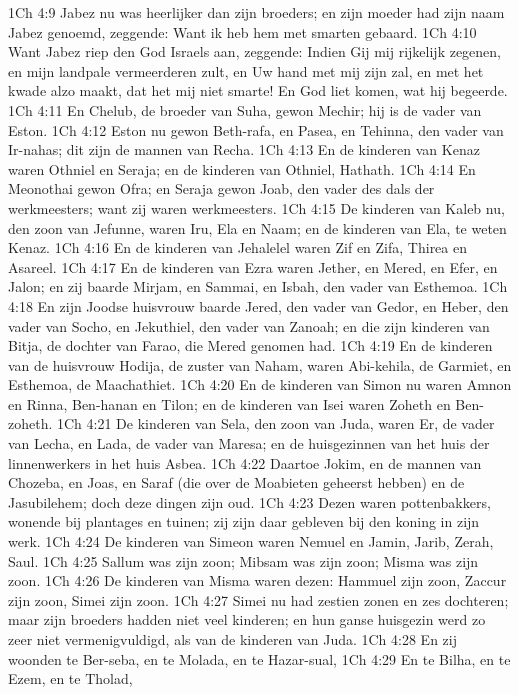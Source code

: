 1Ch 4:9  Jabez nu was heerlijker dan zijn broeders; en zijn moeder had zijn naam Jabez genoemd, zeggende: Want ik heb hem met smarten gebaard.
1Ch 4:10  Want Jabez riep den God Israels aan, zeggende: Indien Gij mij rijkelijk zegenen, en mijn landpale vermeerderen zult, en Uw hand met mij zijn zal, en met het kwade alzo maakt, dat het mij niet smarte! En God liet komen, wat hij begeerde.
1Ch 4:11  En Chelub, de broeder van Suha, gewon Mechir; hij is de vader van Eston.
1Ch 4:12  Eston nu gewon Beth-rafa, en Pasea, en Tehinna, den vader van Ir-nahas; dit zijn de mannen van Recha.
1Ch 4:13  En de kinderen van Kenaz waren Othniel en Seraja; en de kinderen van Othniel, Hathath.
1Ch 4:14  En Meonothai gewon Ofra; en Seraja gewon Joab, den vader des dals der werkmeesters; want zij waren werkmeesters.
1Ch 4:15  De kinderen van Kaleb nu, den zoon van Jefunne, waren Iru, Ela en Naam; en de kinderen van Ela, te weten Kenaz.
1Ch 4:16  En de kinderen van Jehalelel waren Zif en Zifa, Thirea en Asareel.
1Ch 4:17  En de kinderen van Ezra waren Jether, en Mered, en Efer, en Jalon; en zij baarde Mirjam, en Sammai, en Isbah, den vader van Esthemoa.
1Ch 4:18  En zijn Joodse huisvrouw baarde Jered, den vader van Gedor, en Heber, den vader van Socho, en Jekuthiel, den vader van Zanoah; en die zijn kinderen van Bitja, de dochter van Farao, die Mered genomen had.
1Ch 4:19  En de kinderen van de huisvrouw Hodija, de zuster van Naham, waren Abi-kehila, de Garmiet, en Esthemoa, de Maachathiet.
1Ch 4:20  En de kinderen van Simon nu waren Amnon en Rinna, Ben-hanan en Tilon; en de kinderen van Isei waren Zoheth en Ben-zoheth.
1Ch 4:21  De kinderen van Sela, den zoon van Juda, waren Er, de vader van Lecha, en Lada, de vader van Maresa; en de huisgezinnen van het huis der linnenwerkers in het huis Asbea.
1Ch 4:22  Daartoe Jokim, en de mannen van Chozeba, en Joas, en Saraf (die over de Moabieten geheerst hebben) en de Jasubilehem; doch deze dingen zijn oud.
1Ch 4:23  Dezen waren pottenbakkers, wonende bij plantages en tuinen; zij zijn daar gebleven bij den koning in zijn werk.
1Ch 4:24  De kinderen van Simeon waren Nemuel en Jamin, Jarib, Zerah, Saul.
1Ch 4:25  Sallum was zijn zoon; Mibsam was zijn zoon; Misma was zijn zoon.
1Ch 4:26  De kinderen van Misma waren dezen: Hammuel zijn zoon, Zaccur zijn zoon, Simei zijn zoon.
1Ch 4:27  Simei nu had zestien zonen en zes dochteren; maar zijn broeders hadden niet veel kinderen; en hun ganse huisgezin werd zo zeer niet vermenigvuldigd, als van de kinderen van Juda.
1Ch 4:28  En zij woonden te Ber-seba, en te Molada, en te Hazar-sual,
1Ch 4:29  En te Bilha, en te Ezem, en te Tholad,
